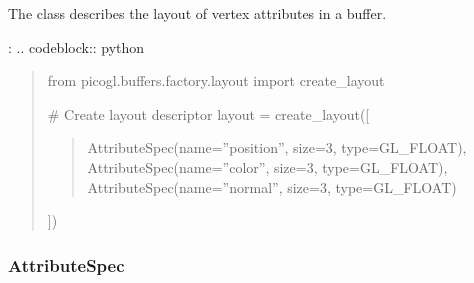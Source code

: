 \documentclass[a4paper,10pt,english,openany,oneside]{sphinxmanual}
\begin{document}
\sphinxAtStartPar
The  class describes the layout of vertex attributes in a buffer.

\sphinxAtStartPar
{}:
.. code\sphinxhyphen{}block:: python
\begin{quote}

\sphinxAtStartPar
from picogl.buffers.factory.layout import create\_layout

\sphinxAtStartPar
\# Create layout descriptor
layout = create\_layout({[}
\begin{quote}

\sphinxAtStartPar
AttributeSpec(name=”position”, size=3, type=GL\_FLOAT),
AttributeSpec(name=”color”, size=3, type=GL\_FLOAT),
AttributeSpec(name=”normal”, size=3, type=GL\_FLOAT)
\end{quote}

\sphinxAtStartPar
{]})
\end{quote}


\subsubsection{AttributeSpec}
\label{\detokenize{api/buffers:attributespec}}
\end{document}
